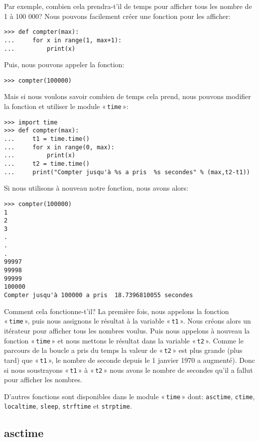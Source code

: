 Par exemple, combien cela prendra-t'il de temps pour afficher tous les nombre de 1 à 100 000?  Nous pouvons facilement créer une fonction pour les afficher:
\begin{Verbatim}[frame=single,rulecolor=\color{gray}]
>>> def compter(max):
...     for x in range(1, max+1):
...         print(x)
\end{Verbatim}

Puis, nous pouvons appeler la fonction:
\begin{Verbatim}[frame=single,rulecolor=\color{gray}]
>>> compter(100000)
\end{Verbatim}

Mais si nous voulons savoir combien de temps cela prend, nous pouvons modifier la fonction et utiliser le module  « \texttt{time} »:

\begin{Verbatim}[frame=single,rulecolor=\color{gray}]
>>> import time
>>> def compter(max):
...     t1 = time.time()
...     for x in range(0, max):
...         print(x)
...     t2 = time.time()
...     print("Compter jusqu'à %s a pris  %s secondes" % (max,t2-t1))
\end{Verbatim}

Si nous utilisons à nouveau notre fonction, nous avons alors:

\begin{Verbatim}[frame=single,rulecolor=\color{gray}]
>>> compter(100000)
1
2
3
.
.
.
99997
99998
99999
100000
Compter jusqu'à 100000 a pris  18.7396810055 secondes
\end{Verbatim}

Comment cela fonctionne-t'il? La première fois, nous appelons la fonction « \texttt{time} », puis nous assignons le résultat à la variable « \texttt{t1} ». Nous créons alors un itérateur pour afficher tous les nombres voulus. Puis nous appelons à nouveau la fonction « \texttt{time} » et nous mettons le résultat dans la variable « \texttt{t2} ». Comme le parcours de la boucle a pris du temps la valeur de « \texttt{t2} » est plus grande (plus tard) que « \texttt{t1} », le nombre de seconde depuis  le 1 janvier 1970 a augmenté). Donc si nous soustrayons « \texttt{t1} » à « \texttt{t2} » nous avons le nombre de secondes qu'il a fallut pour afficher les nombres.

D'autres fonctions sont disponibles dans le module « \texttt{time} » dont: \verb+asctime+, \verb+ctime+, \verb+localtime+, \verb+sleep+, \verb+strftime+ et \verb+strptime+.

\subsection{asctime}


